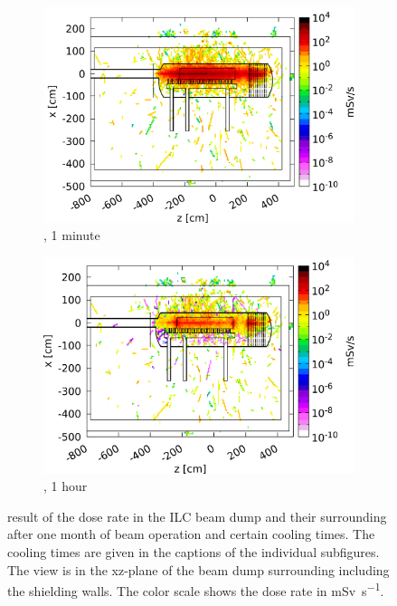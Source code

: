 \begin{figure}[!h]
 \centering
  \begin{subfigure}[b]{0.49\textwidth}
   \centering
    \includegraphics[width=\textwidth]{Figures/BeamDump/Design1_1.png}
   \caption{\designone, 1 minute}
   \end{subfigure}
   \hfill
    \begin{subfigure}[b]{0.49\textwidth}
   \centering
    \includegraphics[width=\textwidth]{Figures/BeamDump/Design1_2.png}
   \caption{\designone, 1 hour}
   \end{subfigure}
       \caption[Dose rate in the ILC main beam dump \designone after cooling times]{\fluka result of the dose rate in the ILC beam dump \designone and their surrounding after one month of beam operation and certain cooling times.
   The cooling times are given in the captions of the individual subfigures.
   The view is in the xz-plane of the beam dump surrounding including the shielding walls.
   The color scale shows the dose rate in \si{\milli\sievert\per\second}.}
   \label{fig:BeamDumps:DoseRate_Design1}
   \end{figure}

